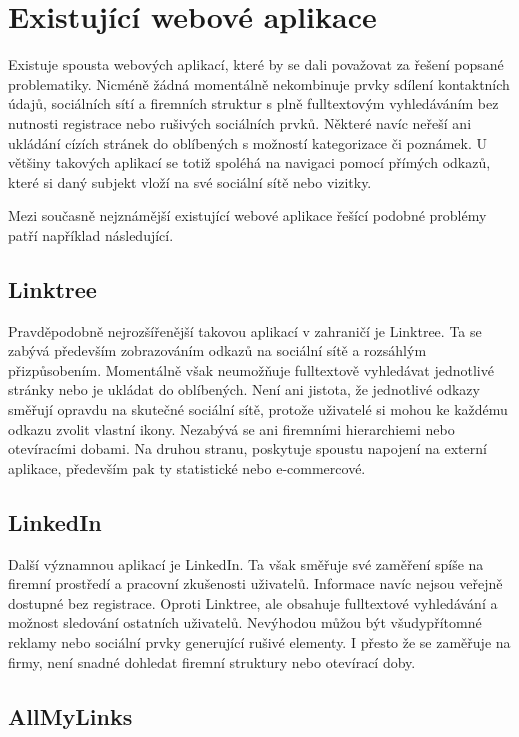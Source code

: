 \section{Existující webové aplikace}

Existuje spousta webových aplikací, které by se dali považovat za řešení popsané problematiky.
Nicméně žádná momentálně nekombinuje prvky sdílení kontaktních údajů, sociálních sítí a firemních struktur s plně
fulltextovým vyhledáváním bez nutnosti registrace nebo rušivých sociálních prvků.
Některé navíc neřeší ani ukládání cízích stránek do oblíbených s možností kategorizace či poznámek.
U většiny takových aplikací se totiž spoléhá na navigaci pomocí přímých odkazů, které si daný subjekt
vloží na své sociální sítě nebo vizitky.

Mezi současně nejznámější existující webové aplikace řešící podobné problémy patří například následující.

	\subsection{Linktree}

	Pravděpodobně nejrozšířenější takovou aplikací v zahraničí je Linktree.
	Ta se zabývá především zobrazováním odkazů na sociální sítě a rozsáhlým přizpůsobením.
	Momentálně však neumožňuje fulltextově vyhledávat jednotlivé stránky nebo je ukládat do oblíbených.
	Není ani jistota, že jednotlivé odkazy směřují opravdu na skutečné sociální sítě, protože uživatelé si mohou ke každému
	odkazu zvolit vlastní ikony.
	Nezabývá se ani firemními hierarchiemi nebo otevíracími dobami.
	Na druhou stranu, poskytuje spoustu napojení na externí aplikace, především pak ty statistické nebo e-commercové.

	\subsection{LinkedIn}

	Další významnou aplikací je LinkedIn.
	Ta však směřuje své zaměření spíše na firemní prostředí a pracovní zkušenosti uživatelů.
	Informace navíc nejsou veřejně dostupné bez registrace.
	Oproti Linktree, ale obsahuje fulltextové vyhledávání a možnost sledování ostatních uživatelů.
	Nevýhodou můžou být všudypřítomné reklamy nebo sociální prvky generující rušivé elementy.
	I přesto že se zaměřuje na firmy, není snadné dohledat firemní struktury nebo otevírací doby.

	\subsection{AllMyLinks}

